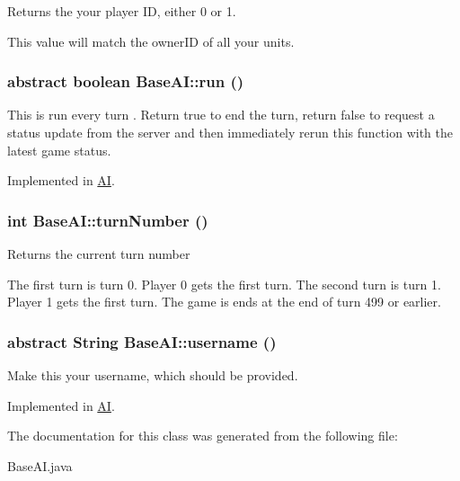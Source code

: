 Returns the your player ID, either 0 or 1.

This value will match the ownerID of all your units. \hypertarget{classBaseAI_56c96a58c1f1e93d17f9817711a45594}{
\subsubsection[{run}]{\setlength{\rightskip}{0pt plus 5cm}abstract boolean BaseAI::run ()}}
\label{classBaseAI_56c96a58c1f1e93d17f9817711a45594}


This is run every turn . Return true to end the turn, return false to request a status update from the server and then immediately rerun this function with the latest game status. 

Implemented in \hyperlink{classAI_f25b3a076daef2aaf9f74ecf458bdfbc}{AI}.\hypertarget{classBaseAI_19ade7391bfe101884a35f48fb840199}{
\subsubsection[{turnNumber}]{\setlength{\rightskip}{0pt plus 5cm}int BaseAI::turnNumber ()}}
\label{classBaseAI_19ade7391bfe101884a35f48fb840199}


Returns the current turn number

The first turn is turn 0. Player 0 gets the first turn. The second turn is turn 1. Player 1 gets the first turn. The game is ends at the end of turn 499 or earlier. \hypertarget{classBaseAI_a26770dd7db8dd0c4466dd770d4e05ba}{
\subsubsection[{username}]{\setlength{\rightskip}{0pt plus 5cm}abstract String BaseAI::username ()}}
\label{classBaseAI_a26770dd7db8dd0c4466dd770d4e05ba}


Make this your username, which should be provided. 

Implemented in \hyperlink{classAI_d7e6db6b414a192ad2af8656d012cfdc}{AI}.

The documentation for this class was generated from the following file:\begin{CompactItemize}
\item 
BaseAI.java\end{CompactItemize}
